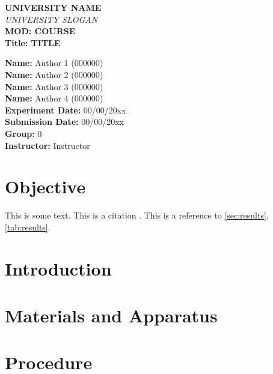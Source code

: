 


\begin{titlepage}
    \centering
    \vspace*{0.5cm}

    \textbf{\Large UNIVERSITY NAME}\\[0.3cm]
    \textit{UNIVERSITY SLOGAN}\\[2cm]

    {\LARGE \textbf{MOD: COURSE}}\\[1cm]
    {\Large \textbf{Title: TITLE}}\\[3cm]

    \begin{flushleft}
        \textbf{Name:} Author 1 (000000)\\[0.3cm]
        \textbf{Name:} Author 2 (000000)\\[0.3cm]
        \textbf{Name:} Author 3 (000000)\\[0.3cm]
        \textbf{Name:} Author 4 (000000)\\[0.3cm]
        \textbf{Experiment Date:} 00/00/20xx\\[0.3cm]
        \textbf{Submission Date:} 00/00/20xx\\[0.3cm]
        \textbf{Group:} 0\\[0.3cm]
        \textbf{Instructor:} Instructor
    \end{flushleft}
\end{titlepage}

\tableofcontents
\newpage

\section{Objective}
This is some text. This is a citation \citep{author20xx}. This is a reference to \cref{sec:results}, \cref{tab:results}.

\section{Introduction}\label{sec:intro}

\section{Materials and Apparatus}

\section{Procedure}\label{sec:procedure}

